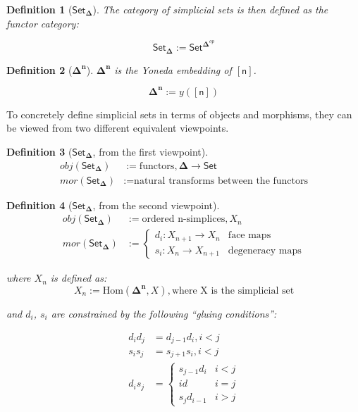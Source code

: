 \documentclass[10pt]{amsart}
\newtheorem{definition}{Definition}
\newcommand{\BDelta}{\ensuremath{\boldsymbol{\Delta}}}
\newcommand{\Simplex}{\ensuremath{\boldsymbol{\Delta^n}}}
\newcommand{\SSet}{\ensuremath{\mathsf{Set}_{\boldsymbol{\Delta}}}}
\newcommand{\Set}{\ensuremath{\mathsf{Set}}}
\newcommand{\sq}[1]{\ensuremath{\mathsf{[#1]}}}
\begin{document}
\begin{definition}[\SSet]
  The category of simplicial sets is then defined as the functor category:

  \begin{equation*}
    \SSet := \Set^{\BDelta^{op}}
  \end{equation*}
\end{definition}

\begin{definition}[\Simplex]
  $\Simplex$ is the Yoneda embedding of \sq{n}.

  \begin{equation*}
    \Simplex := y(\sq{n})
  \end{equation*}
\end{definition}

To concretely define simplicial sets in terms of objects and morphisms, they can be viewed from two different equivalent viewpoints.

\begin{definition}[\SSet, from the first viewpoint]
  \begin{align*}
    obj(\SSet) & := \text{functors}, \BDelta \rightarrow \Set      \\
    mor(\SSet) & := \text{natural transforms between the functors}
  \end{align*}
\end{definition}

\begin{definition}[\SSet, from the second viewpoint]
  \begin{align*}
    obj(\SSet) & := \text{ordered n-simplices}, X_n \\
    mor(\SSet) & :=
    \begin{cases}
      d_i : X_{n + 1} \rightarrow X_n & \text{face maps}       \\
      s_i : X_n \rightarrow X_{n + 1} & \text{degeneracy maps}
    \end{cases}
  \end{align*}

  where $X_n$ is defined as:
  \begin{equation*}
    X_n := \text{Hom}(\Simplex, X), \text{where X is the simplicial set}
  \end{equation*}

  and $d_i$, $s_i$ are constrained by the following ``gluing conditions'':

  \begin{align*}
    d_i d_j & = d_{j - 1} d_i, i < j \\
    s_i s_j & = s_{j + 1} s_i, i < j \\
    d_i s_j & =
    \begin{cases}
      s_{j - 1} d_i & i < j \\
      id            & i = j \\
      s_j d_{i - 1} & i > j
    \end{cases}
  \end{align*}
\end{definition}
\end{document}
